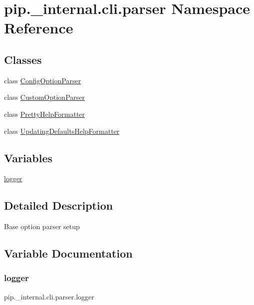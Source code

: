 \hypertarget{namespacepip_1_1__internal_1_1cli_1_1parser}{}\section{pip.\+\_\+internal.\+cli.\+parser Namespace Reference}
\label{namespacepip_1_1__internal_1_1cli_1_1parser}
\subsection*{Classes}
\begin{DoxyCompactItemize}
\item 
class \hyperlink{classpip_1_1__internal_1_1cli_1_1parser_1_1ConfigOptionParser}{Config\+Option\+Parser}
\item 
class \hyperlink{classpip_1_1__internal_1_1cli_1_1parser_1_1CustomOptionParser}{Custom\+Option\+Parser}
\item 
class \hyperlink{classpip_1_1__internal_1_1cli_1_1parser_1_1PrettyHelpFormatter}{Pretty\+Help\+Formatter}
\item 
class \hyperlink{classpip_1_1__internal_1_1cli_1_1parser_1_1UpdatingDefaultsHelpFormatter}{Updating\+Defaults\+Help\+Formatter}
\end{DoxyCompactItemize}
\subsection*{Variables}
\begin{DoxyCompactItemize}
\item 
\hyperlink{namespacepip_1_1__internal_1_1cli_1_1parser_a651293c8eed0f1a9a919240b61a4ce65}{logger}
\end{DoxyCompactItemize}


\subsection{Detailed Description}
\begin{DoxyVerb}Base option parser setup\end{DoxyVerb}
 

\subsection{Variable Documentation}
\mbox{\label{namespacepip_1_1__internal_1_1cli_1_1parser_a651293c8eed0f1a9a919240b61a4ce65}} 
\subsubsection{\texorpdfstring{logger}{logger}}
{\footnotesize\ttfamily pip.\+\_\+internal.\+cli.\+parser.\+logger}

